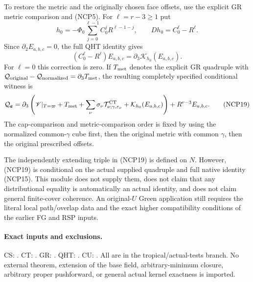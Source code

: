 To restore the metric and the originally chosen face offsets, use
the explicit GR metric comparison and (NCP5).  For
$\ell=r-3\ge1$ put
\[
 h_0=-\Phi_0\sum_{j=0}^{\ell-1}C_0^jR^{\ell-1-j},
 \qquad Dh_0=C_0^\ell-R^\ell.
 \tag{NCP17}
\]
Since $\partial_2E_{a,b,c}=0$, the full QHT identity gives
\[
 (C_0^\ell-R^\ell)E_{a,b,c}
             =\partial_3\mathcal K_{h_0}(E_{a,b,c}).
 \tag{NCP18}
\]
For $\ell=0$ this correction is zero.  If $T_{\rm met}$ denotes
the explicit GR quadruple with
$\mathcal Q_{\rm original}-\mathcal Q_{\rm normalized}
=\partial_3T_{\rm met}$, the resulting completely specified
conditional witness is
\[
 \mathcal Q_{\boldsymbol\varepsilon}
 =\partial_3\left(
   \mathscr V|_{T=\varpi}+T_{\rm met}
   +\sum_\nu\sigma_\nu\mathcal T^{\rm CT}_{\nu;\gamma,\varepsilon_\nu}
   +\mathcal K_{h_0}(E_{a,b,c})\right)
                         +R^{r-3}E_{a,b,c}.
 \tag{NCP19}
\]
The cap-comparison and metric-comparison order is fixed by using
the normalized common-$\gamma$ cube first, then the original metric
with common $\gamma$, then the original prescribed offsets.

The independently extending triple in (NCP19) is defined on $N$.
However, (NCP19) is conditional on the actual supplied quadruple
and full native identity (NCP15).  This module does not supply them,
does not claim that any distributional equality is automatically
an actual identity, and does not claim general finite-cover coherence.
An original-$U$ Green application still requires the literal local
path/overlap data and the exact higher compatibility conditions of
the earlier FG and RSP inputs.

\paragraph{Exact inputs and exclusions.}
CS: .
CT: .
GR: .
QHT: .
CU: .
All are in the tropical/actual-tests branch.  No external theorem,
extension of the base field, arbitrary-minimum closure, arbitrary
proper pushforward, or general actual kernel exactness is imported.
